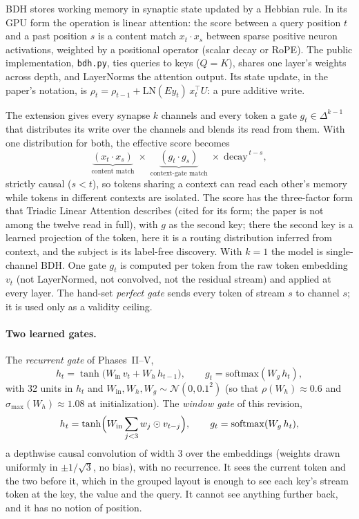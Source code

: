 \documentclass[11pt]{article}
\begin{document}
BDH \cite{bdh} stores working memory in synaptic state updated by a Hebbian rule. In its GPU form the operation is linear attention: the score between a query position $t$ and a past position $s$ is a content match $x_t \cdot x_s$ between sparse positive neuron activations, weighted by a positional operator (scalar decay or RoPE). The public implementation, \texttt{bdh.py}, ties queries to keys ($Q = K$), shares one layer's weights across depth, and LayerNorms the attention output. Its state update, in the paper's notation, is $\rho_{t} = \rho_{t-1} + \mathrm{LN}(E y_{t})\, x_{t}^{\top} U$: a pure additive write.

The extension gives every synapse $k$ channels and every token a gate $g_t \in \Delta^{k-1}$ that distributes its write over the channels and blends its read from them. With one distribution for both, the effective score becomes
\begin{equation}
\underbrace{(x_t \cdot x_s)}_{\text{content match}}\;\times\;\underbrace{(g_t \cdot g_s)}_{\text{context-gate match}}\;\times\;\mathrm{decay}^{\,t-s},
\label{eq:score}
\end{equation}
strictly causal ($s < t$), so tokens sharing a context can read each other's memory while tokens in different contexts are isolated. The score has the three-factor form that Triadic Linear Attention \cite{tla} describes (cited for its form; the paper is not among the twelve read in full), with $g$ as the second key; there the second key is a learned projection of the token, here it is a routing distribution inferred from context, and the subject is its label-free discovery. With $k = 1$ the model is single-channel BDH. One gate $g_t$ is computed per token from the raw token embedding $v_t$ (not LayerNormed, not convolved, not the residual stream) and applied at every layer. The hand-set \emph{perfect gate} sends every token of stream $s$ to channel $s$; it is used only as a validity ceiling.

\paragraph{Two learned gates.} The \emph{recurrent gate} of Phases~II--V,
\begin{equation}
h_t = \tanh\bigl(W_{\mathrm{in}}\,v_t + W_h\,h_{t-1}\bigr), \qquad g_t = \mathrm{softmax}(W_g\,h_t),
\label{eq:gate}
\end{equation}
with 32 units in $h_t$ and $W_{\mathrm{in}}, W_h, W_g \sim \mathcal{N}(0, 0.1^2)$ (so that $\rho(W_h) \approx 0.6$ and $\sigma_{\max}(W_h) \approx 1.08$ at initialization). The \emph{window gate} of this revision,
\begin{equation}
h_t = \tanh\Bigl(W_{\mathrm{in}} \sum_{j<3} w_j \odot v_{t-j}\Bigr), \qquad g_t = \mathrm{softmax}(W_g\,h_t),
\label{eq:window}
\end{equation}
a depthwise causal convolution of width 3 over the embeddings (weights drawn uniformly in $\pm 1/\sqrt{3}$, no bias), with no recurrence. It sees the current token and the two before it, which in the grouped layout is enough to see each key's stream token at the key, the value and the query. It cannot see anything further back, and it has no notion of position.
\end{document}
